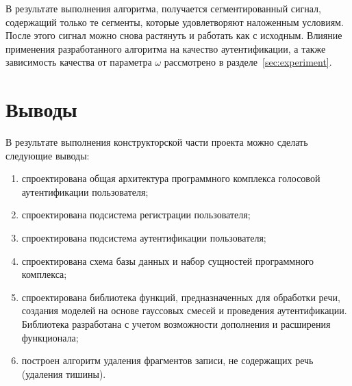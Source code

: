 В результате выполнения алгоритма, получается сегментированный сигнал, содержащий только те сегменты, которые удовлетворяют наложенным условиям. После этого сигнал можно снова растянуть и работать как с исходным. Влияние применения разработанного алгоритма на качество аутентификации, а также зависимость качества от параметра $\omega$ рассмотрено в разделе~\ref{sec:experiment}.

\section{Выводы}

В результате выполнения конструкторской части проекта можно сделать следующие выводы:
\begin{enumerate}
\item спроектирована общая архитектура программного комплекса голосовой аутентификации пользователя;
\item спроектирована подсистема регистрации пользователя;
\item спроектирована подсистема аутентификации пользователя;
\item спроектирована схема базы данных и набор сущностей программного комплекса;
\item спроектирована библиотека функций, предназначенных для обработки речи, создания моделей на основе гауссовых смесей и проведения аутентификации. Библиотека разработана с учетом возможности дополнения и расширения функционала;
\item построен алгоритм удаления фрагментов записи, не содержащих речь (удаления тишины).
\end{enumerate}

